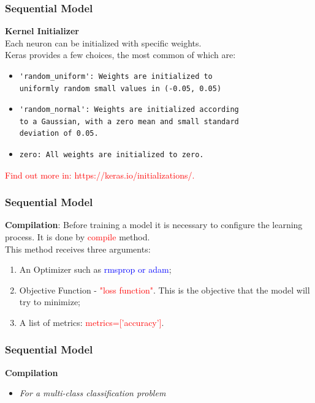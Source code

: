 \documentclass[aspectratio=169]{beamer}
\begin{document}
\begin{frame}[fragile]
\frametitle{Sequential Model}
\textbf{Kernel Initializer} 
\\[0.6cm]
Each neuron can be initialized with specific weights.
\\[0.3cm]
Keras provides a few choices, the most common of which are:
\begin{itemize}
\item \begin{verbatim}'random_uniform': Weights are initialized to 
uniformly random small values in (-0.05, 0.05)\end{verbatim}  
\item \begin{verbatim}'random_normal': Weights are initialized according 
to a Gaussian, with a zero mean and small standard 
deviation of 0.05.\end{verbatim}
\item \begin{verbatim}zero: All weights are initialized to zero.\end{verbatim}
\end{itemize}
\textcolor{red}{Find out more in: https://keras.io/initializations/.} 
\end{frame}

\begin{frame}
\frametitle{Sequential Model}
\textbf{Compilation}:
Before training a model it is necessary to configure the learning process. It is done by \textcolor{red}{compile} method. 
\\[0.5cm]
This method receives three arguments:
\\[0.3cm]
\begin{enumerate}
\item An Optimizer such as \textcolor{blue}{rmsprop or adam};
\\[0.3cm]
\item  Objective Function - \textcolor{red}{"loss function"}. This is the objective that the model will try to minimize;
\\[0.3cm]
\item A list of metrics: \textcolor{red}{metrics=['accuracy']}.
\end{enumerate}
\end{frame}

\begin{frame}
\frametitle{Sequential Model}
\textbf{Compilation}
\\[0.5cm]
\begin{itemize}
\item \textit{For a multi-class classification problem}
\inputminted{python}{two.py}
\end{itemize}
\end{frame}
\end{document}
